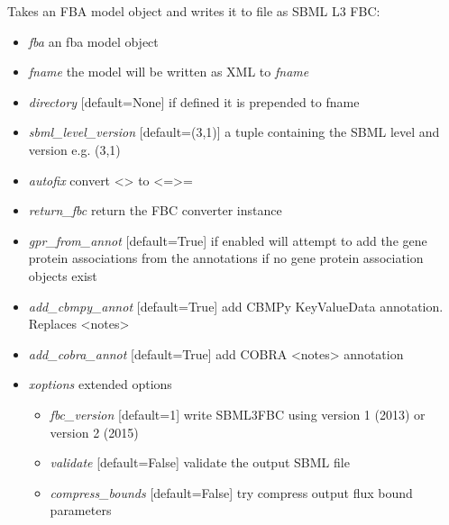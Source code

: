\documentclass[a4paper,11pt,english]{sphinxmanual}
\begin{document}
\begin{fulllineitems}
\label{modules_doc:cbmpy.CBXML.sbml_writeSBML3FBC}
Takes an FBA model object and writes it to file as SBML L3 FBC:
\begin{itemize}
\item {} 
\emph{fba} an fba model object

\item {} 
\emph{fname} the model will be written as XML to \emph{fname}

\item {} 
\emph{directory} {[}default=None{]} if defined it is prepended to fname

\item {} 
\emph{sbml\_level\_version} {[}default=(3,1){]} a tuple containing the SBML level and version e.g. (3,1)

\item {} 
\emph{autofix} convert \textless{}\textgreater{} to \textless{}=\textgreater{}=

\item {} 
\emph{return\_fbc} return the FBC converter instance

\item {} 
\emph{gpr\_from\_annot} {[}default=True{]} if enabled will attempt to add the gene protein associations from the annotations
if no gene protein association objects exist

\item {} 
\emph{add\_cbmpy\_annot} {[}default=True{]} add CBMPy KeyValueData annotation. Replaces \textless{}notes\textgreater{}

\item {} 
\emph{add\_cobra\_annot} {[}default=True{]} add COBRA \textless{}notes\textgreater{} annotation

\item {} 
\emph{xoptions} extended options
\begin{itemize}
\item {} 
\emph{fbc\_version} {[}default=1{]} write SBML3FBC using version 1 (2013) or version 2 (2015)

\item {} 
\emph{validate} {[}default=False{]} validate the output SBML file

\item {} 
\emph{compress\_bounds} {[}default=False{]} try compress output flux bound parameters

\end{itemize}

\end{itemize}

\end{fulllineitems}
\end{document}
